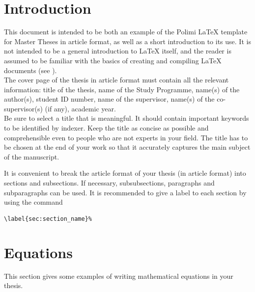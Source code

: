 \documentclass[11pt,a4paper]{article}
\begin{document}


\section{Introduction}
\label{sec:introduction}
This document is intended to be both an example of the Polimi \LaTeX{} template for Master Theses in article format,
as well as a short introduction to its use. It is not intended to be a general introduction to \LaTeX{} itself,
and the reader is assumed to be familiar with the basics of creating and compiling \LaTeX{} documents (see \cite{oetiker1995not, kottwitz2015latex}).
\\
The cover page of the thesis in article format must contain all the relevant information:
title of the thesis, name of the Study Programme, name(s) of the author(s),
student ID number, name of the supervisor, name(s) of the co-supervisor(s) (if any), academic year.
\\
Be sure to select a title that is meaningful.
It should contain important keywords to be identified by indexer.
Keep the title as concise as possible and comprehensible even to people who are not experts in your field.
The title has to be chosen at the end of your work so that it accurately captures the main subject of the manuscript.

It is convenient to break the article format of your thesis (in article format) into sections and subsections.
If necessary, subsubsections, paragraphs and subparagraphs can be used.
It is recommended to give a label to each section by using the command
\begin{verbatim}
\label{sec:section_name}%
\end{verbatim}

\section{Equations}
\label{sec:eqs}
This section gives some examples of writing mathematical equations in your thesis.
\end{document}

